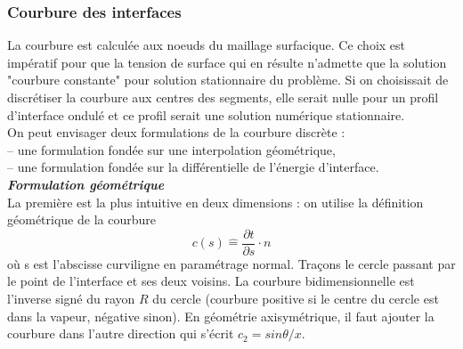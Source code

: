 \subsubsection{Courbure des interfaces}

La courbure est calcul\'ee aux noeuds du maillage surfacique. Ce choix est imp\'eratif pour que la tension de surface qui en r\'esulte n’admette que la solution "courbure constante" pour solution stationnaire du probl\`eme. Si on choisissait de discr\'etiser la courbure aux centres des segments, elle serait nulle pour un profil d’interface ondul\'e et ce profil serait une solution num\'erique stationnaire.\\
On peut envisager deux formulations de la courbure discr\`ete :\\
– une formulation fond\'ee sur une interpolation g\'eom\'etrique,\\
– une formulation fond\'ee sur la diff\'erentielle de l’\'energie d’interface.\smallskip \\

\textit{\textbf{Formulation g\'eom\'etrique}}\smallskip \\

La première est la plus intuitive en deux dimensions : on utilise la d\'efinition g\'eom\'etrique de la courbure
\begin{equation}
c(s) \hat{=} \frac{\partial t}{\partial s} \cdot n
\end{equation}
où s est l’abscisse curviligne en param\'etrage normal. Tra\c cons le cercle passant par le point de l’interface et ses deux voisins. La courbure bidimensionnelle est l’inverse sign\'e du rayon $R$ du cercle (courbure positive si le centre du cercle est dans la vapeur, n\'egative sinon). En g\'eom\'etrie axisym\'etrique, il faut ajouter la courbure dans l’autre direction qui s’\'ecrit $c_{2} = sin \theta / x$.

